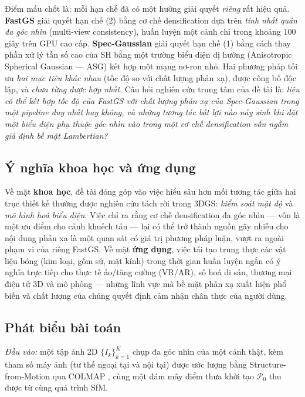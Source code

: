     Điểm mấu chốt là: mỗi hạn chế đã có một hướng giải quyết \textit{riêng} rất hiệu
    quả. \textbf{FastGS} \cite{fastgs} giải quyết hạn chế (2) bằng cơ chế
    densification dựa trên \textit{tính nhất quán đa góc nhìn} (multi-view
    consistency), huấn luyện một cảnh chỉ trong khoảng 100 giây trên GPU cao cấp.
    \textbf{Spec-Gaussian} \cite{specgaussian} giải quyết hạn chế (1) bằng cách thay
    phần xử lý tần số cao của SH bằng một trường biểu diện dị hướng (Anisotropic
    Spherical Gaussian — ASG) kết hợp một mạng nơ-ron nhỏ. Hai phương pháp tối ưu
    \textit{hai mục tiêu khác nhau} (tốc độ so với chất lượng phản xạ), được công bố
    độc lập, và \textit{chưa từng được hợp nhất}. Câu hỏi nghiên cứu trung tâm của
    đề tài là: \textit{liệu có thể kết hợp tốc độ của FastGS với chất lượng phản xạ
    của Spec-Gaussian trong một pipeline duy nhất hay không, và những tương tác bất
    lợi nào nảy sinh khi đặt một biểu diện phụ thuộc góc nhìn vào trong một cơ chế
    densification vốn ngầm giả định bề mặt Lambertian?}

    \subsection{Ý nghĩa khoa học và ứng dụng}
    Về mặt \textbf{khoa học}, đề tài đóng góp vào việc hiểu sâu hơn mối tương tác
    giữa hai trục thiết kế thường được nghiên cứu tách rời trong 3DGS: \textit{kiểm
    soát mật độ} và \textit{mô hình hoá biểu diện}. Việc chỉ ra rằng cơ chế
    densification đa góc nhìn — vốn là một ưu điểm cho cảnh khuếch tán — lại có thể
    trở thành nguồn gây nhiễu cho nội dung phản xạ là một quan sát có giá trị phương
    pháp luận, vượt ra ngoài phạm vi của riêng FastGS. Về mặt \textbf{ứng dụng},
    việc tái tạo trung thực các vật liệu bóng (kim loại, gốm sứ, mặt kính) trong
    thời gian huấn luyện ngắn có ý nghĩa trực tiếp cho thực tế ảo/tăng cường (VR/AR),
    số hoá di sản, thương mại điện tử 3D và mô phỏng — những lĩnh vực mà bề mặt phản
    xạ xuất hiện phổ biến và chất lượng của chúng quyết định cảm nhận chân thực của
    người dùng.

    \subsection{Phát biểu bài toán}
    \textit{Đầu vào:} một tập ảnh 2D $\{I_k\}_{k=1}^{K}$ chụp đa góc nhìn của một
    cảnh thật, kèm tham số máy ảnh (tư thế ngoại tại và nội tại) được ước lượng bằng
    Structure-from-Motion qua COLMAP \cite{colmap,sfmsurvey}, cùng một đám mây điểm
    thưa khởi tạo $\mathcal{P}_0$ thu được từ cùng quá trình SfM.

